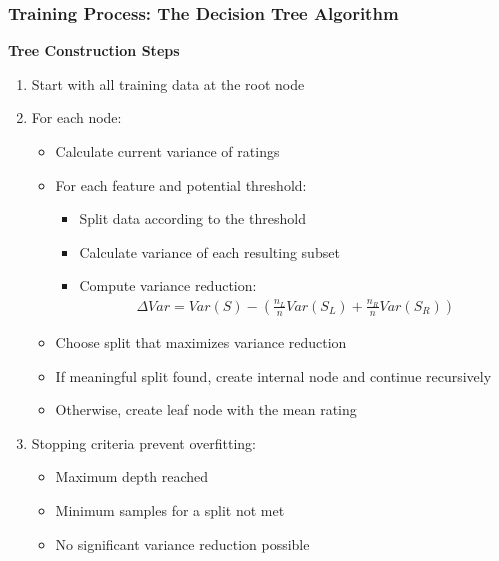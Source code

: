 \documentclass{beamer}
\begin{document}
\begin{frame}
\frametitle{Training Process: The Decision Tree Algorithm}
\textbf{Tree Construction Steps}
\begin{enumerate}
    \item Start with all training data at the root node
    \item For each node:
    \begin{itemize}
        \item Calculate current variance of ratings
        \item For each feature and potential threshold:
        \begin{itemize}
            \item Split data according to the threshold
            \item Calculate variance of each resulting subset
            \item Compute variance reduction:
            \begin{align*}
            \Delta Var = Var(S) - \left(\frac{n_L}{n} Var(S_L) + \frac{n_R}{n} Var(S_R) \right)
            \end{align*}
        \end{itemize}
        \item Choose split that maximizes variance reduction
        \item If meaningful split found, create internal node and continue recursively
        \item Otherwise, create leaf node with the mean rating
    \end{itemize}
    \item Stopping criteria prevent overfitting:
    \begin{itemize}
        \item Maximum depth reached
        \item Minimum samples for a split not met
        \item No significant variance reduction possible
    \end{itemize}
\end{enumerate}
\end{frame}
\end{document}
